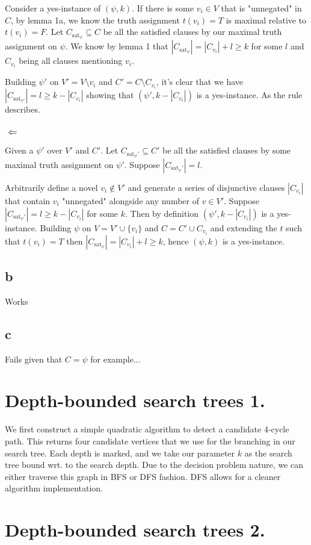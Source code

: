 \documentclass{article}
\begin{document}
Consider a yes-instance of $(\psi, k)$. If there is some $v_i \in V$ that is "unnegated" in $C$, by lemma 1a, we know the truth assignment $t(v_i)=T$ is maximal relative to $t(v_i)=F$. Let $C_{\text{sat}_\psi} \subseteq C$ be all the satisfied clauses by our maximal truth assignment on $\psi$. We know by lemma 1 that $|C_{\text{sat}_\psi}| = |C_{v_i}| + l \geq k$ for some $l$ and $C_{v_i}$ being all clauses mentioning $v_i$.

Building $\psi'$ on $V'=V \setminus {v_i}$ and $C'=C \setminus C_{v_i}$, it's clear that we have $|C_{\text{sat}_{\psi'}}| = l \geq k - |C_{v_i}|$ showing that $(\psi', k - |C_{v_i}|)$ is a yes-instance. As the rule describes.

\subsubsection*{$\Leftarrow$}
Given a $\psi'$ over $V'$ and $C'$. Let $C_{\text{sat}_\psi'} \subseteq C'$ be all the satisfied clauses by some maximal truth assignment on $\psi'$. Suppose $|C_{\text{sat}_\psi'}| = l$.

Arbitrarily define a novel $v_i \not\in V'$ and generate a series of disjunctive clauses $|C_{v_i}|$ that contain $v_i$ "unnegated" alongside any number of $v \in V'$. Suppose $|C_{\text{sat}_\psi'}| = l \geq k - |C_{v_i}|$ for some $k$. Then by definition $(\psi', k - |C_{v_i}|)$ is a yes-instance. Building $\psi$ on $V = V' \cup \{v_i\}$ and $C = C' \cup {C_{v_i}}$ and extending the $t$ such that $t(v_i)=T$ then $|C_{\text{sat}_\psi}| = |C_{v_i}| + l \geq k$, hence $(\psi, k)$ is a yes-instance.


\subsection*{b}
Works
\subsection*{c}
Fails given that $C = \psi$ for example...

\section{Depth-bounded search trees 1.}
We first construct a simple quadratic algorithm to detect a candidate 4-cycle path. This returns four candidate vertices that we use for the branching in our search tree. Each depth is marked, and we take our parameter $k$ as the search tree bound wrt. to the search depth. Due to the decision problem nature, we can either traverse this graph in BFS or DFS fashion. DFS allows for a cleaner algorithm implementation.

\section{Depth-bounded search trees 2.}
\end{document}
